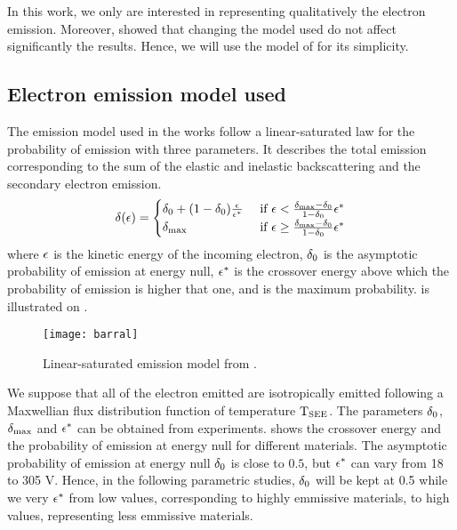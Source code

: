 In this work, we only are interested in representing qualitatively the electron emission.
Moreover, \citet{croes2017} showed that changing the model used do not affect significantly the results. 
Hence, we will use the model of \citet{barral2003a} for its simplicity.

\subsection{Electron emission model used}
The emission model used in the works follow a linear-saturated law for the probability of emission with three parameters. 
It describes the total emission corresponding to the sum of the elastic and inelastic backscattering and the secondary electron emission.
\begin{equation} \label{eq-proba_barral}
  \delta (\epsilon) = 
  \begin{cases}
    \delta _0 + (1 - \delta _0) \frac{\epsilon}{\epsilon^*}   &\text{ if } \epsilon < \frac{\delta _{\rm max}  - \delta _0}{1 - \delta _0} \epsilon^*  \\
    \delta _{\rm max}  &\text{ if } \epsilon \geq \frac{\delta _{\rm max}  - \delta _0}{1 - \delta _0} \epsilon^*
  \end{cases}
\end{equation}
where $\epsilon$ is the kinetic energy of the incoming electron, $\delta _0$ is the asymptotic probability of emission at energy null, $\epsilon^*$ is the crossover energy above which the probability of emission is higher that one, and \probamax is the maximum probability.
 is illustrated on .

\begin{figure}[hbtp]
  \centering
  \texttt{[image: barral]}
  \caption{Linear-saturated emission model from \citet{barral2003a}.}
  \label{fig-modelbarral}
\end{figure}

 We suppose that all of the electron emitted are isotropically emitted following a Maxwellian flux distribution function of temperature $\mathrm{T_{SEE}}$.
 The parameters $\delta _0$,  $\delta _{\rm max} $ and $\epsilon^*$ can be obtained from experiments. 
  shows the crossover energy and the  probability of emission at energy null for different materials.
 The  asymptotic probability of emission at energy null $\delta _0$ is close to $0.5$, but $\epsilon^*$ can vary from 18 to 305 V.
 Hence, in the following parametric studies, $\delta _0$ will be kept at 0.5 while we very $\epsilon^*$ from low values, corresponding to highly emmissive materials, to high values, representing less emmissive materials.
 
